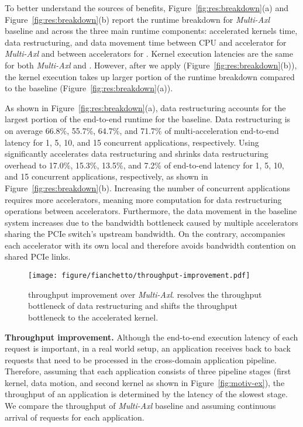 To better understand the sources of benefits, Figure~\ref{fig:res:breakdown}(a) and Figure~\ref{fig:res:breakdown}(b) report the runtime breakdown for \emph{Multi-Axl} baseline and \dmx across the three main runtime components: accelerated kernels time, data restructuring, and data movement time between CPU and accelerator for \emph{Multi-Axl} and between accelerators for \dmx.
%
Kernel execution latencies are the same for both \emph{Multi-Axl} and \dmx.
%
However, after we apply \dmx (Figure~\ref{fig:res:breakdown}(b)), the kernel execution takes up larger portion of the runtime breakdown compared to the baseline (Figure~\ref{fig:res:breakdown}(a)).
%

As shown in Figure~\ref{fig:res:breakdown}(a), 
data restructuring accounts for the largest portion of the end-to-end runtime for the baseline.
%
Data restructuring is on average 66.8\%, 55.7\%, 64.7\%, and 71.7\% of multi-acceleration end-to-end latency for 1, 5, 10, and 15 concurrent applications, respectively.  
%
Using \drx significantly accelerates data restructuring and shrinks data restructuring overhead to 17.0\%, 15.3\%, 13.5\%, and 7.2\% of \dmx end-to-end latency for 1, 5, 10, and 15 concurrent applications, respectively, as shown in Figure~\ref{fig:res:breakdown}(b).
%
Increasing the number of concurrent applications requires more accelerators, meaning more computation for data restructuring operations between accelerators.
%
Furthermore, the data movement in the baseline system increases due to the bandwidth bottleneck caused by multiple accelerators sharing the PCIe switch's upstream bandwidth. %
%
On the contrary, \dmx accompanies each accelerator with its own local \drx and therefore avoids bandwidth contention on shared PCIe links.

\begin{figure}[t!]
    \centering
    \texttt{[image: figure/fianchetto/throughput-improvement.pdf]}
    \caption{\dmx throughput improvement over \emph{Multi-Axl}. \dmx resolves the throughput bottleneck of data restructuring and shifts the throughput bottleneck to the accelerated kernel.}
    \label{fig:res:throughput}
\end{figure}

\noindent \textbf{Throughput improvement.}
Although the end-to-end execution latency of each request is important, in a real world setup, an application receives back to back requests that need to be processed in the cross-domain application pipeline. Therefore, assuming that each application consists of three pipeline stages (first kernel, data motion, and second kernel as shown in Figure~\ref{fig:motiv-ex}), the throughput of an application is determined by the latency of the slowest stage. We compare the throughput of \emph{Multi-Axl} baseline and \dmx assuming continuous arrival of requests for each application. 

